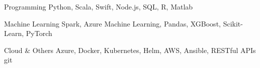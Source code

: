 \begin{cvskills}

  \cvskill
    {Programming}
    {Python, Scala, Swift, Node.js, SQL, R, Matlab}

  \cvskill
    {Machine Learning}
    {Spark, Azure Machine Learning, Pandas, XGBoost, Scikit-Learn, PyTorch}

  \cvskill
    {Cloud \& Others}
    {Azure, Docker, Kubernetes, Helm, AWS, Ansible, RESTful APIs git}

\end{cvskills}
